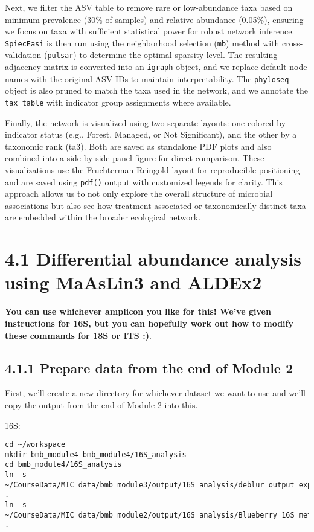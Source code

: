 \documentclass[
]{book}
\begin{document}
Next, we filter the ASV table to remove rare or low-abundance taxa based on minimum prevalence (30\% of samples) and relative abundance (0.05\%), ensuring we focus on taxa with sufficient statistical power for robust network inference. \texttt{SpiecEasi} is then run using the neighborhood selection (\texttt{mb}) method with cross-validation (\texttt{pulsar}) to determine the optimal sparsity level. The resulting adjacency matrix is converted into an \texttt{igraph} object, and we replace default node names with the original ASV IDs to maintain interpretability. The \texttt{phyloseq} object is also pruned to match the taxa used in the network, and we annotate the \texttt{tax\_table} with indicator group assignments where available.

Finally, the network is visualized using two separate layouts: one colored by indicator status (e.g., Forest, Managed, or Not Significant), and the other by a taxonomic rank (ta3). Both are saved as standalone PDF plots and also combined into a side-by-side panel figure for direct comparison. These visualizations use the Fruchterman-Reingold layout for reproducible positioning and are saved using \texttt{pdf()} output with customized legends for clarity. This approach allows us to not only explore the overall structure of microbial associations but also see how treatment-associated or taxonomically distinct taxa are embedded within the broader ecological network.

\section{4.1 Differential abundance analysis using MaAsLin3 and ALDEx2}\label{differential-abundance-analysis-using-maaslin3-and-aldex2}

\textbf{You can use whichever amplicon you like for this! We've given instructions for 16S, but you can hopefully work out how to modify these commands for 18S or ITS :)}.

\subsection{4.1.1 Prepare data from the end of Module 2}\label{prepare-data-from-the-end-of-module-2}

First, we'll create a new directory for whichever dataset we want to use and we'll copy the output from the end of Module 2 into this.

16S:

\begin{verbatim}
cd ~/workspace
mkdir bmb_module4 bmb_module4/16S_analysis
cd bmb_module4/16S_analysis
ln -s ~/CourseData/MIC_data/bmb_module3/output/16S_analysis/deblur_output_exported/ .
ln -s ~/CourseData/MIC_data/bmb_module2/output/16S_analysis/Blueberry_16S_metadata.tsv .
\end{verbatim}
\end{document}
